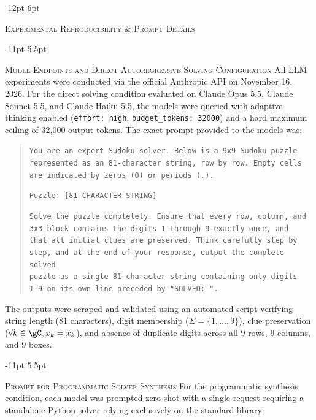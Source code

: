 \documentclass{article} %
\makeatletter
\renewcommand\section{\@startsection{section}{1}{\z@}%
  {-12pt \@plus -3pt \@minus -2pt}%
  {6pt \@plus 2pt}%
  {\normalfont\fontsize{12}{14}\selectfont\scshape\raggedright}}
\renewcommand\subsection{\@startsection{subsection}{2}{\z@}%
  {-11pt \@plus -3pt \@minus -2pt}%
  {5.5pt \@plus 2pt}%
  {\normalfont\fontsize{10}{12}\selectfont\scshape\raggedright}}
\makeatother
\begin{document}
\section{\textsc{Experimental Reproducibility \& Prompt Details}}
\label{app:reproducibility}

\subsection{\textsc{Model Endpoints and Direct Autoregressive Solving Configuration}}
All LLM experiments were conducted via the official Anthropic API on November 16, 2026. For the direct solving condition evaluated on Claude Opus 5.5, Claude Sonnet 5.5, and Claude Haiku 5.5, the models were queried with adaptive thinking enabled (\texttt{effort: high}, \texttt{budget\_tokens: 32000}) and a hard maximum ceiling of 32,000 output tokens. The exact prompt provided to the models was:

\begin{quote}
\small
\texttt{You are an expert Sudoku solver. Below is a 9x9 Sudoku puzzle}\\
\texttt{represented as an 81-character string, row by row. Empty cells}\\
\texttt{are indicated by zeros (0) or periods (.).}

\medskip
\texttt{Puzzle: [81-CHARACTER STRING]}

\medskip
\texttt{Solve the puzzle completely. Ensure that every row, column, and}\\
\texttt{3x3 block contains the digits 1 through 9 exactly once, and}\\
\texttt{that all initial clues are preserved. Think carefully step by}\\
\texttt{step, and at the end of your response, output the complete solved}\\
\texttt{puzzle as a single 81-character string containing only digits}\\
\texttt{1-9 on its own line preceded by "SOLVED: ".}
\end{quote}

The outputs were scraped and validated using an automated script verifying string length (81 characters), digit membership ($\Sigma = \{1, \dots, 9\}$), clue preservation ($\forall k \in \gC, x_k = \bar{x}_k$), and absence of duplicate digits across all 9 rows, 9 columns, and 9 boxes.

\subsection{\textsc{Prompt for Programmatic Solver Synthesis}}
For the programmatic synthesis condition, each model was prompted zero-shot with a single request requiring a standalone Python solver relying exclusively on the standard library:
\end{document}
